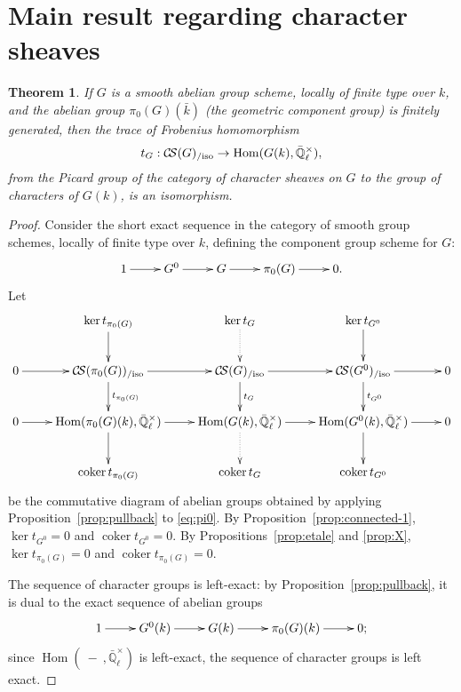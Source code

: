 \documentclass[11pt]{amsart}
\theoremstyle{plain}
\newtheorem{theorem}{Theorem}[section]
\theoremstyle{definition}
\theoremstyle{remark}
\newcommand{\EE}{\mathbb{\bar Q}_\ell}
\newcommand{\bFq}{\bar{k}}
\newcommand{\Fq}{k}
\DeclareMathOperator{\Hom}{Hom}
\DeclareMathOperator{\coker}{coker}
\newcommand{\CS}{{\mathcal{C\hskip-1.8pt S}}}
\begin{document}
\section{Main result regarding character sheaves}

%
\begin{theorem}\label{thm:snake}
If $G$ is a smooth abelian group scheme, locally of finite type over $\Fq$, and the abelian group $\pi_0(G)(\bFq)$ (the geometric component group) is finitely generated, then the trace of Frobenius homomorphism
\[
t_{G} : \CS(G)_{/\text{iso}} \to \Hom(G(\Fq),\EE^\times),
\]
from the Picard group of the category of character sheaves on $G$ to the group of characters of $G(\Fq)$, is an isomorphism. 
\end{theorem}

\begin{proof}
Consider the short exact sequence in the category of smooth group schemes, locally of finite type over $\Fq$, defining the component group scheme for $G$:
\begin{equation}\label{eq:pi0}
\xymatrix{
1 \ar[r] & G^0 \ar[r] & G \ar[r] & \pi_0(G) \ar[r] & 0.
}
\end{equation}
Let 
\[
\xymatrix{
& \ar[d] \ker t_{\pi_0(G)} & \ar@{.>}[d] \ker t_{G} & \ar[d] \ker t_{G^0} & \\
0\ar[r] & \ar[d]^{t_{\pi_0(G)}} \CS(\pi_0(G))_{/\text{iso}} \ar[r] & \ar[d]^{t_{G}} \CS(G)_{/\text{iso}} \ar[r] & \ar[d]^{t_{G^0}} \CS(G^0)_{/\text{iso}} \ar[r] & 0\\
0 \ar[r] & \ar[d] \Hom(\pi_0(G)(\Fq),\EE^\times) \ar[r] & \ar@{.>}[d] \Hom(G(\Fq),\EE^\times) \ar[r] & \ar[d] \Hom(G^0(\Fq),\EE^\times) \ar[r] & 0\\
& \coker t_{\pi_0(G)} & \coker t_{G} &  \coker t_{G^0} & \\
}
\]
be the commutative diagram of abelian groups obtained by applying Proposition~\ref{prop:pullback} to \eqref{eq:pi0}.
By Proposition~\ref{prop:connected-1}, $\ker t_{G^0} =0$ and $\coker t_{G^0}=0$. By Propositions~\ref{prop:etale} and \ref{prop:X}, $\ker t_{\pi_0(G)}=0$ and $\coker t_{\pi_0(G)}=0$. 


The sequence of character groups is left-exact: by Proposition~\ref{prop:pullback}, it is dual to the exact sequence of abelian groups
\begin{equation}\label{eq:pi0}
\xymatrix{
1 \ar[r] & G^0(\Fq) \ar[r] & G(\Fq) \ar[r] & \pi_0(G)(\Fq) \ar[r] & 0;
}
\end{equation}
since $\Hom(\ - \ ,\EE^\times)$ is left-exact, the sequence of character groups is left exact. 


\end{proof}
\end{document}
